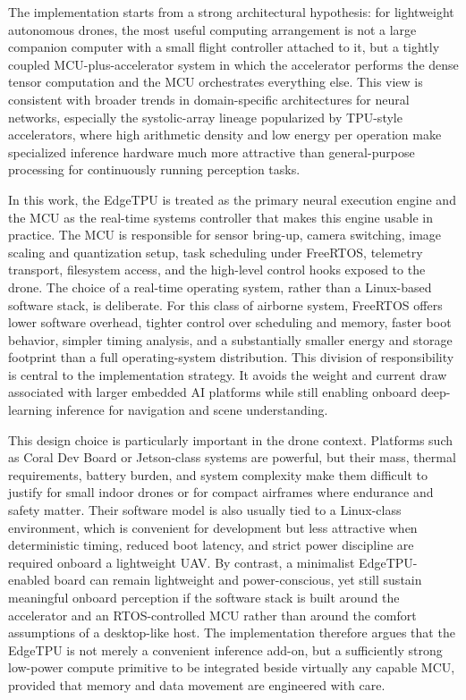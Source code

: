 The implementation starts from a strong architectural hypothesis: for
lightweight autonomous drones, the most useful computing arrangement is
not a large companion computer with a small flight controller attached
to it, but a tightly coupled MCU-plus-accelerator system in which the
accelerator performs the dense tensor computation and the MCU
orchestrates everything else. This view is consistent with broader
trends in domain-specific architectures for neural networks, especially
the systolic-array lineage popularized by TPU-style accelerators, where
high arithmetic density and low energy per operation make specialized
inference hardware much more attractive than general-purpose processing
for continuously running perception tasks.

In this work, the EdgeTPU is treated as the primary neural execution
engine and the MCU as the real-time systems controller that makes this
engine usable in practice. The MCU is responsible for sensor bring-up,
camera switching, image scaling and quantization setup, task scheduling
under FreeRTOS, telemetry transport, filesystem access, and the
high-level control hooks exposed to the drone. The choice of a real-time
operating system, rather than a Linux-based software stack, is
deliberate. For this class of airborne system, FreeRTOS offers lower
software overhead, tighter control over scheduling and memory, faster
boot behavior, simpler timing analysis, and a substantially smaller
energy and storage footprint than a full operating-system distribution.
This division of responsibility is central to the implementation
strategy. It avoids the weight and current draw associated with larger
embedded AI platforms while still enabling onboard deep-learning
inference for navigation and scene understanding.

This design choice is particularly important in the drone context.
Platforms such as Coral Dev Board or Jetson-class systems are powerful,
but their mass, thermal requirements, battery burden, and system
complexity make them difficult to justify for small indoor drones or for
compact airframes where endurance and safety matter. Their software
model is also usually tied to a Linux-class environment, which is
convenient for development but less attractive when deterministic
timing, reduced boot latency, and strict power discipline are required
onboard a lightweight UAV. By contrast, a minimalist EdgeTPU-enabled
board can remain lightweight and power-conscious, yet still sustain
meaningful onboard perception if the software stack is built around the
accelerator and an RTOS-controlled MCU rather than around the comfort
assumptions of a desktop-like host. The implementation therefore argues
that the EdgeTPU is not merely a convenient inference add-on, but a
sufficiently strong low-power compute primitive to be integrated beside
virtually any capable MCU, provided that memory and data movement are
engineered with care.

